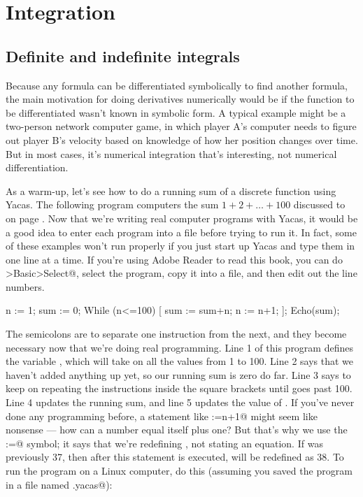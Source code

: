 \chapter{Integration}

\section{Definite and indefinite integrals}

Because any formula can be differentiated symbolically to find another formula,
the main motivation for doing derivatives numerically would be if the function to be
differentiated wasn't known in symbolic form.
A typical example might be a two-person network computer game, in which player A's
computer needs to figure out player B's velocity based on knowledge of how her
position changes over time. But in most cases, it's numerical integration that's
interesting, not numerical differentiation.

As a warm-up, let's see how to do a running sum of a discrete function using Yacas.
The following program computers the sum $1+2+\ldots+100$ discussed to on page
\pageref{gauss-story}. Now that we're writing real computer programs with Yacas, it would be a good
idea to enter each program into a file before trying to run it. In fact, some
of these examples won't run properly if you just start up Yacas and type them in
one line at a time. If you're using Adobe Reader to read this book, you can
do \verb@Tools>Basic>Select@, select the program, copy it into a file,
and then edit out the line numbers.

\restartLineNumbers
\begin{eg}
\startcodeeg
\begin{Code}
  \nn n := 1;
  \nn sum := 0;
  \nn While (n<=100) [
  \nn   sum := sum+n;
  \nn   n := n+1;
  \nn ];
  \nn Echo(sum);
\end{Code}
\end{eg}

The semicolons are to separate one instruction from the next, and they become necessary
now that we're doing real programming.
Line 1 of this program defines the variable \verb@n@, which will take on all the values
from 1 to 100. Line 2 says that we haven't added anything up yet, so our running
sum is zero do far. Line 3 says to keep on repeating the instructions inside the
square brackets until \verb@n@ goes past 100. Line 4 updates the running sum, and
line 5 updates the value of \verb@n@. If you've never done any programming before,
a statement like \verb@n:=n+1@ might seem like nonsense --- how can a number equal
itself plus one? But that's why we use the \verb@:=@ symbol; it says that we're redefining
\verb@n@, not stating an equation. If \verb@n@ was previously 37, then after this statement is
executed, \verb@n@ will be redefined as 38.
To run the program on a Linux computer,
do this (assuming you saved the program in a file named \verb@sum.yacas@):

